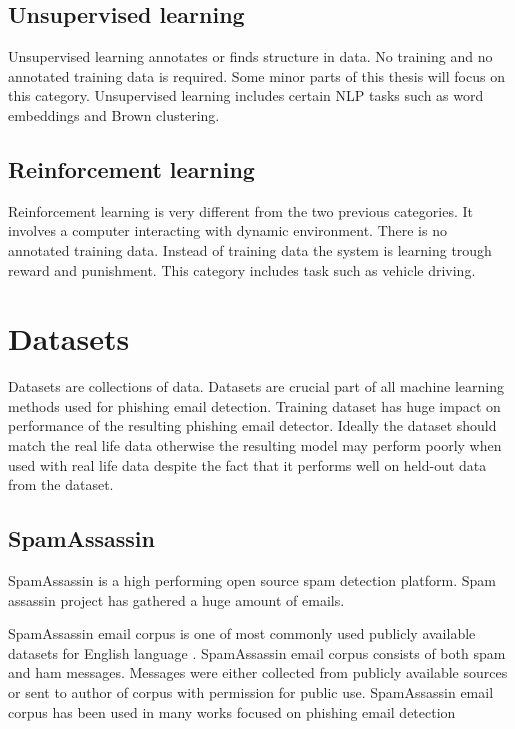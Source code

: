 \documentclass[thesis=B,english]{FITthesis}[2012/10/20]
\begin{document}
\subsection{Unsupervised learning}
\par Unsupervised learning annotates or finds structure in data. No training and no annotated training data is required. Some minor parts of this thesis will focus on this category. Unsupervised learning includes certain NLP tasks such as word embeddings \cite{word2vec} and Brown clustering.

\subsection{Reinforcement learning}
\par Reinforcement learning is very different from the two previous categories. It involves a computer interacting with dynamic environment. There is no annotated training data. Instead of training data the system is learning trough reward and punishment. This category includes task such as vehicle driving.


\section{Datasets}
Datasets are collections of data. Datasets are crucial part of all machine learning methods used for phishing email detection. Training dataset has huge impact on performance of the resulting phishing email detector. Ideally the dataset should match the real life data otherwise the resulting model may perform poorly when used with real life data despite the fact that it performs well on held-out data from the dataset.

\subsection{SpamAssassin}
SpamAssassin \cite{spamAssassin} is a high performing \cite{fette2007learning} open source spam detection platform. Spam assassin project has gathered a huge amount of emails.   

\par SpamAssassin email corpus is one of most commonly used publicly available datasets for English language \cite{spamAssassinDataset}. SpamAssassin email corpus consists of both spam and ham messages. Messages were either collected from publicly available sources or sent to author of corpus with permission for public use. SpamAssassin email corpus has been used in many works focused on phishing email detection \cite{ultimateFeatureBreakdown} \cite{fette2007learning} \cite{indiaPaperMultiClassifier}
\end{document}
